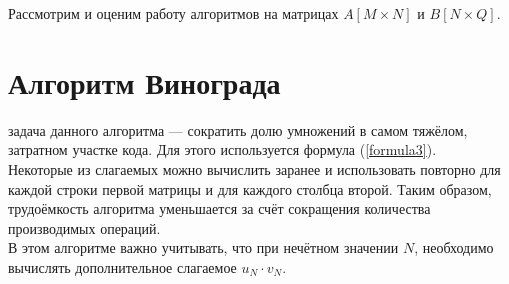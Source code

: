 Рассмотрим и оценим работу алгоритмов на матрицах $A[M \times N]$ и $B[N \times Q]$. 

\section{Алгоритм Винограда}
 задача данного алгоритма --- сократить долю умножений в самом тяжёлом, затратном участке кода. Для этого используется формула (\ref{formula3}).\\

Некоторые из слагаемых можно вычислить заранее и использовать повторно для каждой строки первой матрицы и для каждого столбца второй. Таким образом, трудоёмкость алгоритма уменьшается за счёт сокращения количества производимых операций.\\

В этом алгоритме важно учитывать, что при нечётном значении $N$, необходимо вычислять дополнительное слагаемое $u_N \cdot v_N$.\\

